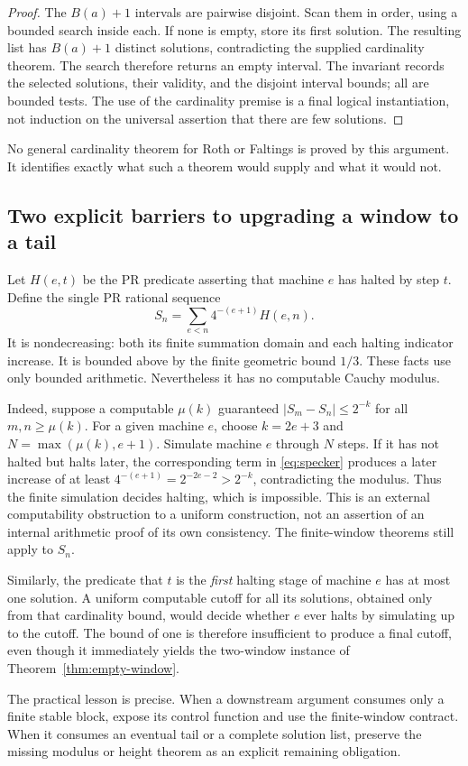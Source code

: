 \begin{proof}
The \(B(a)+1\) intervals are pairwise disjoint.  Scan them in order,
using a bounded search inside each.  If none is empty, store its first
solution.  The resulting list has \(B(a)+1\) distinct solutions,
contradicting the supplied cardinality theorem.  The search therefore
returns an empty interval.  The invariant records the selected solutions,
their validity, and the disjoint interval bounds; all are bounded tests.
The use of the cardinality premise is a final logical instantiation,
not induction on the universal assertion that there are few solutions.
\end{proof}

No general cardinality theorem for Roth or Faltings is proved by this
argument.  It identifies exactly what such a theorem would supply and
what it would not.

\subsection{Two explicit barriers to upgrading a window to a tail}

Let \(H(e,t)\) be the PR predicate asserting that machine \(e\) has
halted by step \(t\).  Define the single PR rational sequence
\begin{equation}\label{eq:specker}
 S_n=\sum_{e<n}4^{-(e+1)}H(e,n).
\end{equation}
It is nondecreasing: both its finite summation domain and each halting
indicator increase.  It is bounded above by the finite geometric bound
\(1/3\).  These facts use only bounded arithmetic.  Nevertheless it
has no computable Cauchy modulus.

Indeed, suppose a computable \(\mu(k)\) guaranteed
\(|S_m-S_n|\le2^{-k}\) for all \(m,n\ge\mu(k)\).
For a given machine \(e\), choose \(k=2e+3\) and
\(N=\max(\mu(k),e+1)\).  Simulate machine \(e\) through \(N\)
steps.  If it has not halted but halts later, the corresponding term in
\eqref{eq:specker} produces a later increase of at least
\(4^{-(e+1)}=2^{-2e-2}>2^{-k}\), contradicting the modulus.
Thus the finite simulation decides halting, which is impossible.
This is an external computability obstruction to a uniform construction,
not an assertion of an internal arithmetic proof of its own consistency.
The finite-window theorems still apply to \(S_n\).

Similarly, the predicate that \(t\) is the \emph{first} halting stage of
machine \(e\) has at most one solution.  A uniform computable cutoff
for all its solutions, obtained only from that cardinality bound, would
decide whether \(e\) ever halts by simulating up to the cutoff.  The
bound of one is therefore insufficient to produce a final cutoff, even
though it immediately yields the two-window instance of
Theorem~\ref{thm:empty-window}.

The practical lesson is precise.  When a downstream argument consumes
only a finite stable block, expose its control function and use the
finite-window contract.  When it consumes an eventual tail or a complete
solution list, preserve the missing modulus or height theorem as an
explicit remaining obligation.

